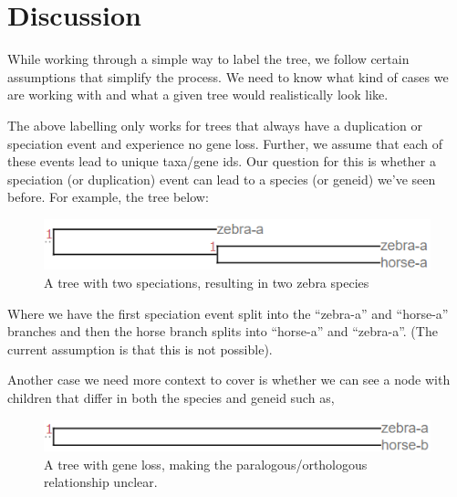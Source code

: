 \documentclass[
  11pt,
  letterpaper,
  oneside]{book}
\begin{document}
\hypertarget{discussion}{%
\section{Discussion}\label{discussion}}

While working through a simple way to label the tree, we follow certain
assumptions that simplify the process. We need to know what kind of
cases we are working with and what a given tree would realistically look
like.

The above labelling only works for trees that always have a duplication
or speciation event and experience no gene loss. Further, we assume that
each of these events lead to unique taxa/gene ids. Our question for this
is whether a speciation (or duplication) event can lead to a species (or
geneid) we've seen before. For example, the tree below:

\begin{figure}

{\centering \includegraphics{./figures/RepeatSpecExample.PNG}

}

\caption{A tree with two speciations, resulting in two zebra species}

\end{figure}

Where we have the first speciation event split into the ``zebra-a'' and
``horse-a'' branches and then the horse branch splits into ``horse-a''
and ``zebra-a''. (The current assumption is that this is not possible).

Another case we need more context to cover is whether we can see a node
with children that differ in both the species and geneid such as,

\begin{figure}

{\centering \includegraphics{./figures/AmbigousExample.PNG}

}

\caption{A tree with gene loss, making the paralogous/orthologous
relationship unclear.}

\end{figure}
\end{document}
